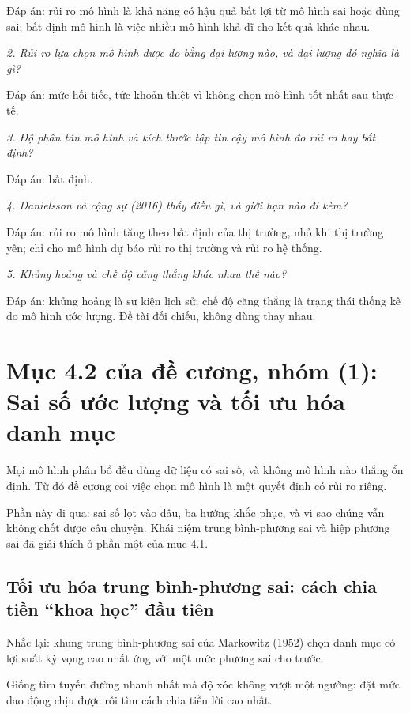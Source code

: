Đáp án: rủi ro mô hình là khả năng có hậu quả bất lợi từ mô hình sai hoặc dùng sai; bất định mô hình là việc nhiều mô hình khả dĩ cho kết quả khác nhau.

{\itshape 2. Rủi ro lựa chọn mô hình được đo bằng đại lượng nào, và đại lượng đó nghĩa là gì?\par}

Đáp án: mức hối tiếc, tức khoản thiệt vì không chọn mô hình tốt nhất sau thực tế.

{\itshape 3. Độ phân tán mô hình và kích thước tập tin cậy mô hình đo rủi ro hay bất định?\par}

Đáp án: bất định.

{\itshape 4. Danielsson và cộng sự (2016) thấy điều gì, và giới hạn nào đi kèm?\par}

Đáp án: rủi ro mô hình tăng theo bất định của thị trường, nhỏ khi thị trường yên; chỉ cho mô hình dự báo rủi ro thị trường và rủi ro hệ thống.

{\itshape 5. Khủng hoảng và chế độ căng thẳng khác nhau thế nào?\par}

Đáp án: khủng hoảng là sự kiện lịch sử; chế độ căng thẳng là trạng thái thống kê do mô hình ước lượng. Đề tài đối chiếu, không dùng thay nhau.

\chapter{Mục 4.2 của đề cương, nhóm (1): Sai số ước lượng và tối ưu hóa danh mục}

Mọi mô hình phân bổ đều dùng dữ liệu có sai số, và không mô hình nào thắng ổn định. Từ đó đề cương coi việc chọn mô hình là một quyết định có rủi ro riêng.

Phần này đi qua: sai số lọt vào đâu, ba hướng khắc phục, và vì sao chúng vẫn không chốt được câu chuyện. Khái niệm trung bình-phương sai và hiệp phương sai đã giải thích ở phần một của mục 4.1.

\section{Tối ưu hóa trung bình-phương sai: cách chia tiền “khoa học” đầu tiên}

Nhắc lại: khung trung bình-phương sai của Markowitz (1952) chọn danh mục có lợi suất kỳ vọng cao nhất ứng với một mức phương sai cho trước.

Giống tìm tuyến đường nhanh nhất mà độ xóc không vượt một ngưỡng: đặt mức dao động chịu được rồi tìm cách chia tiền lời cao nhất.

